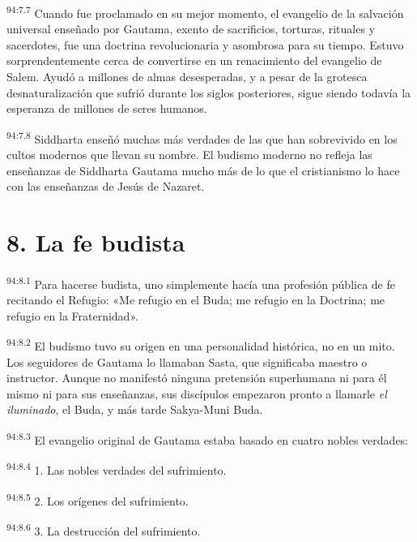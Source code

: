 \par
\textsuperscript{94:7.7} Cuando fue proclamado en su mejor momento, el evangelio de la salvación universal enseñado por Gautama, exento de sacrificios, torturas, rituales y sacerdotes, fue una doctrina revolucionaria y asombrosa para su tiempo. Estuvo sorprendentemente cerca de convertirse en un renacimiento del evangelio de Salem. Ayudó a millones de almas desesperadas, y a pesar de la grotesca desnaturalización que sufrió durante los siglos posteriores, sigue siendo todavía la esperanza de millones de seres humanos.

\par
\textsuperscript{94:7.8} Siddharta enseñó muchas más verdades de las que han sobrevivido en los cultos modernos que llevan su nombre. El budismo moderno no refleja las enseñanzas de Siddharta Gautama mucho más de lo que el cristianismo lo hace con las enseñanzas de Jesús de Nazaret.

\section*{8. La fe budista}
\par
\textsuperscript{94:8.1} Para hacerse budista, uno simplemente hacía una profesión pública de fe recitando el Refugio: «Me refugio en el Buda; me refugio en la Doctrina; me refugio en la Fraternidad».

\par
\textsuperscript{94:8.2} El budismo tuvo su origen en una personalidad histórica, no en un mito. Los seguidores de Gautama lo llamaban Sasta, que significaba maestro o instructor. Aunque no manifestó ninguna pretensión superhumana ni para él mismo ni para sus enseñanzas, sus discípulos empezaron pronto a llamarle \textit{el iluminado}, el Buda, y más tarde Sakya-Muni Buda.

\par
\textsuperscript{94:8.3} El evangelio original de Gautama estaba basado en cuatro nobles verdades:

\par
\textsuperscript{94:8.4} 1. Las nobles verdades del sufrimiento.

\par
\textsuperscript{94:8.5} 2. Los orígenes del sufrimiento.

\par
\textsuperscript{94:8.6} 3. La destrucción del sufrimiento.

